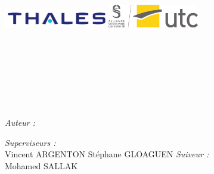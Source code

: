 \makeatletter
  \begin{titlepage}
    \centering
    \noindent\includegraphics[height=0.8cm]{ressources/images/logos/Thales_Logo.png}\hfill\includegraphics[height=1cm]{ressources/images/logos/logo_UTC.png}\\
    \vfill

    \textsc{\Large \reporttitle}\\[0.5cm]
    \HRule \\[0.4cm]
    {\huge \bfseries \reportsubject}\\[0.4cm]
    \HRule \\[1.5cm]
    \textsc{\large \reportdetails}\\[0.5cm]
    \textsc{\large \reportdates}\\[0.5cm]

    \vfill

    \begin{minipage}[t]{0.3\textwidth}
      \begin{flushleft} \large
        \emph{Auteur :}\\
        \reportauthor
      \end{flushleft}
    \end{minipage}
    \begin{minipage}[t]{0.6\textwidth}
      \begin{flushright} \large
        \emph{Superviseurs :} \\
		Vincent \textsc{ARGENTON}
		\linebreak
		Stéphane \textsc{GLOAGUEN} 
		\linebreak
		\emph{Suiveur :} \\
		Mohamed \textsc{SALLAK} 
    
      \end{flushright}
    \end{minipage}
  \end{titlepage}

\makeatother
